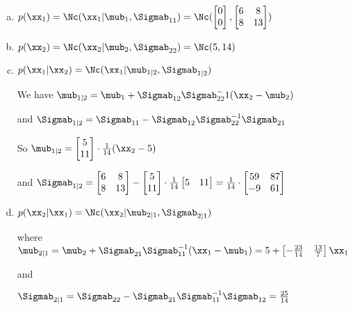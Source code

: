 \documentclass[12pt,letterpaper,fleqn]{hmcpset}
\begin{document}
\begin{solution}
    \begin{enumerate}[(a)]
        \item $p(\xx_1) = \Nc(\xx_1 | \mub_1, \Sigmab_{11}) = \Nc(\begin{bmatrix} 0 \\ 0 \end{bmatrix}, \begin{bmatrix} 6 & 8 \\ 8 & 13 \end{bmatrix})$
        \item $p(\xx_2) = \Nc(\xx_2 | \mub_2, \Sigmab_{22}) = \Nc(5, 14)$
        \item $p(\xx_1 | \xx_2) = \Nc(\xx_1 | \mub_{1|2}, \Sigmab_{1|2})$

            We have $\mub_{1|2} = \mub_1 + \Sigmab_{12} \Sigmab_{22}^-1 (\xx_2 - \mub_2)$

            and $\Sigmab_{1|2} = \Sigmab_{11} - \Sigmab_{12} \Sigmab_{22}^{-1} \Sigmab_{21}$

            So $\mub_{1|2} = \begin{bmatrix} 5 \\ 11 \end{bmatrix} \cdot \frac{1}{14} (\xx_2 - 5)$

            and $\Sigmab_{1|2} = \begin{bmatrix} 6 & 8 \\ 8 & 13 \end{bmatrix} - \begin{bmatrix} 5 \\ 11 \end{bmatrix} \cdot \frac{1}{14} \begin{bmatrix} 5 & 11 \end{bmatrix} = \frac{1}{14} \cdot \begin{bmatrix} 59 & 87 \\ -9 & 61 \end{bmatrix}$

        \item $p(\xx_2 | \xx_1) = \Nc(\xx_2 | \mub_{2|1}, \Sigmab_{2|1})$

            where $\mub_{2|1} = \mub_2 + \Sigmab_{21} \Sigmab_{11}^{-1} (\xx_1 - \mub_1) = 5 + \begin{bmatrix} -\frac{23}{14} & \frac{13}{7} \end{bmatrix} \xx_1$

            and

            $\Sigmab_{2|1} = \Sigmab_{22} - \Sigmab_{21} \Sigmab_{11}^{-1} \Sigmab_{12} = \frac{25}{14}$
    \end{enumerate}
\end{solution}
\newpage
\end{document}
